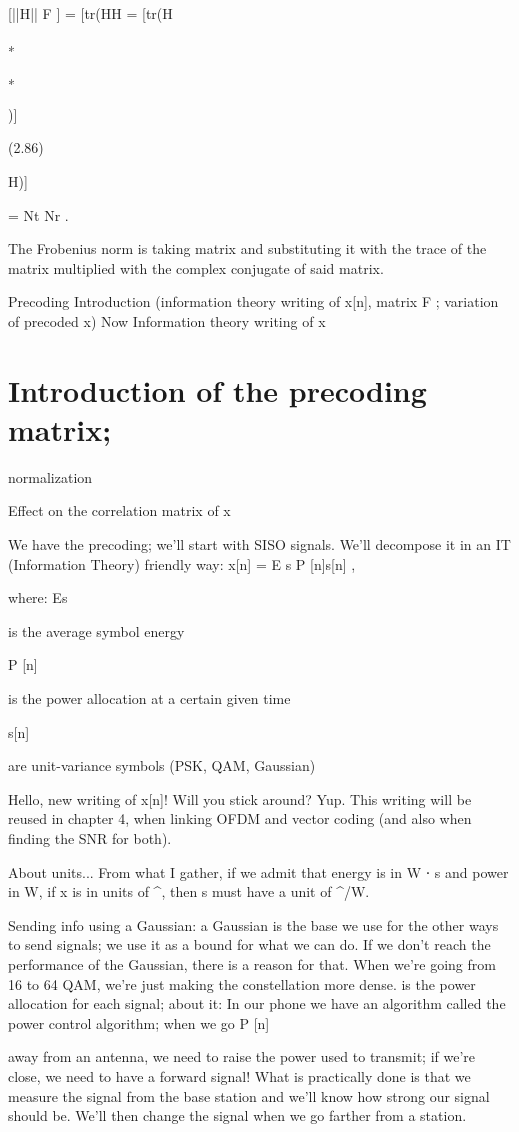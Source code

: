 {[||H|| F ] = [tr(HH
= [tr(H

∗

∗

)]

(2.86)

H)]

= Nt Nr .

The Frobenius norm is taking matrix and substituting it with the trace of the matrix multiplied with the complex conjugate of said matrix.

Precoding Introduction (information theory writing of x[n], matrix F ;
variation of precoded x)
Now Information theory writing of x

\section{Introduction of the precoding matrix;
}normalization

Effect on the correlation matrix of x

We have the precoding; we'll start with SISO signals. We'll decompose it in an IT
(Information Theory) friendly way:
x[n] = \sqrt E s P [n]s[n] ,

where:
Es

is the average symbol energy

P [n]

is the power allocation at a certain given time

s[n]

are unit-variance symbols (PSK, QAM, Gaussian)

​Hello, new writing of x[n]! Will you stick around?
Yup. This writing will be reused in chapter 4, when linking OFDM and vector coding
(and also when finding the SNR for both).

​About units...
From what I gather, if we admit that energy is in W ⋅ s and power in W, if x is in units of ^\star, then s must have a unit of ^\star/W\sqrts.

Sending info using a Gaussian: a Gaussian is the base we use for the other ways to send signals; we use it as a bound for what we can do.
If we don't reach the performance of the Gaussian, there is a reason for that.
When we're going from 16 to 64 QAM, we're just making the constellation more dense.
is the power allocation for each signal; about it:
In our phone we have an algorithm called the power control algorithm; when we go P [n]

away from an antenna, we need to raise the power used to transmit; if we're close,
we need to have a forward signal!
What is practically done is that we measure the signal from the base station and we'll know how strong our signal should be.
We'll then change the signal when we go farther from a station.

}
